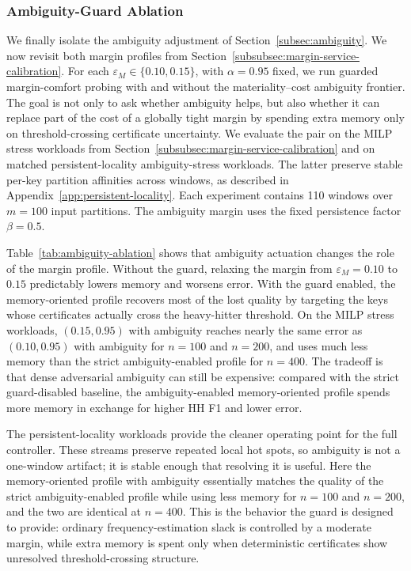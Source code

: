 \documentclass[sigconf, nonacm]{acmart}
\begin{document}
\subsubsection{Ambiguity-Guard Ablation}
\label{subsubsec:ambiguity-ablation}
We finally isolate the ambiguity adjustment of Section~\ref{subsec:ambiguity}.
We now revisit both margin profiles from
Section~\ref{subsubsec:margin-service-calibration}. For each
\(\varepsilon_M\in\{0.10,0.15\}\), with \(\alpha=0.95\) fixed, we run guarded
margin-comfort probing with and without the materiality--cost ambiguity
frontier. The goal is not only to ask whether ambiguity helps, but also whether
it can replace part of the cost of a globally tight margin by spending extra
memory only on threshold-crossing certificate uncertainty. We evaluate the
pair on the MILP stress workloads from
Section~\ref{subsubsec:margin-service-calibration} and on matched
persistent-locality ambiguity-stress workloads. The latter preserve stable
per-key partition affinities across windows, as described in
Appendix~\ref{app:persistent-locality}. Each experiment contains 110 windows
over \(m=100\) input partitions. The ambiguity margin uses the fixed
persistence factor \(\beta=0.5\).



Table~\ref{tab:ambiguity-ablation} shows that ambiguity actuation changes the
role of the margin profile. Without the guard, relaxing the margin from
\(\varepsilon_M=0.10\) to \(0.15\) predictably lowers memory and worsens error.
With the guard enabled, the memory-oriented profile recovers most of the lost
quality by targeting the keys whose certificates actually cross the
heavy-hitter threshold. On the MILP stress workloads, \((0.15,0.95)\) with
ambiguity reaches nearly the same error as \((0.10,0.95)\) with ambiguity for
\(n=100\) and \(n=200\), and uses much less memory than the strict
ambiguity-enabled profile for \(n=400\). The tradeoff is that dense
adversarial ambiguity can still be expensive: compared with the strict
guard-disabled baseline, the ambiguity-enabled memory-oriented profile spends
more memory in exchange for higher HH F1 and lower error.

The persistent-locality workloads provide the cleaner operating point for the
full controller. These streams preserve repeated local hot spots, so ambiguity
is not a one-window artifact; it is stable enough that resolving it is useful.
Here the memory-oriented profile with ambiguity essentially matches the
quality of the strict ambiguity-enabled profile while using less memory for
\(n=100\) and \(n=200\), and the two are identical at \(n=400\). This is the
behavior the guard is designed to provide: ordinary frequency-estimation slack
is controlled by a moderate margin, while extra memory is spent only when
deterministic certificates show unresolved threshold-crossing structure.
\end{document}
